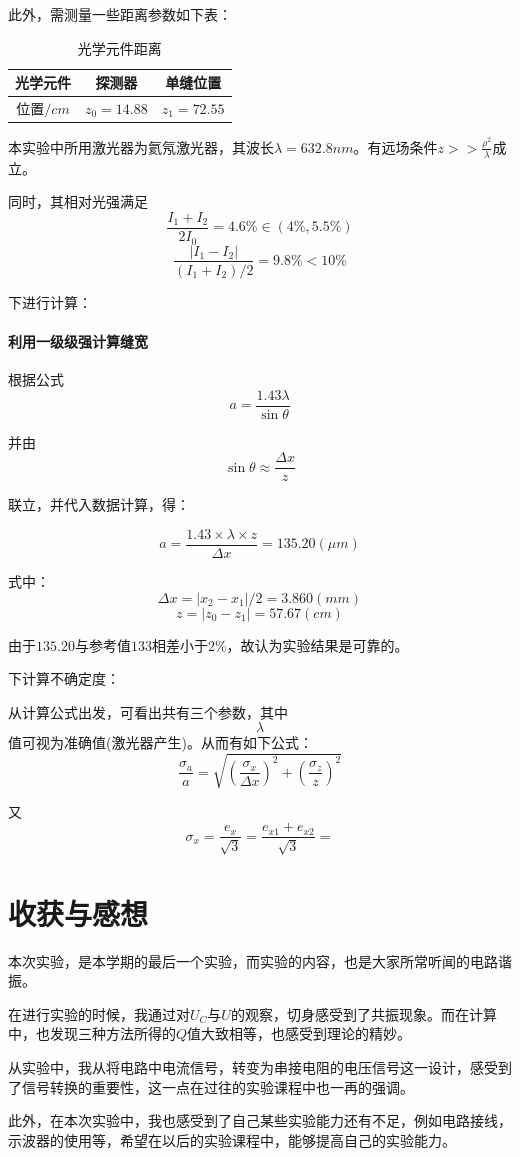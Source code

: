 \documentclass{ctexart}
\begin{document}
  此外，需测量一些距离参数如下表：
\begin{table}[htbp]
  \centering
  \caption{光学元件距离}
    \begin{tabular}{|c|c|c|}\hline
    光学元件  & {探测器} & {单缝位置} \\ \hline
    位置$/cm$ & $z_0=14.88$ & $z_1=72.55$ \\\hline
    \end{tabular}%
  \label{tab:addlabel}%
\end{table}%



本实验中所用激光器为氦氖激光器，其波长$\lambda=632.8nm$。有远场条件$z>>\frac{\rho^2}{\lambda}$成立。

同时，其相对光强满足$$\frac{I_1+I_2}{2I_0}=4.6\%\in(4\%,5.5\%)$$
$$\frac{|I_1-I_2|}{(I_1+I_2)/2}=9.8\%<10\%$$

下进行计算：
\paragraph{利用一级级强计算缝宽}
根据公式
$$a=\frac{1.43\lambda}{\sin{\theta}}$$

并由$$\sin{\theta}\approx \frac{\Delta x}{z}$$

联立，并代入数据计算，得：

$$a=\frac{1.43 \times \lambda \times z}{\Delta x}=135.20(\mu m)$$


式中：$$\Delta x=|x_2-x_1|/2=3.860(mm)$$
$$z=|z_0-z_1|=57.67(cm)$$

由于$135.20\mbox{与参考值}133\mbox{相差小于}2\%$，故认为实验结果是可靠的。

下计算不确定度：

从计算公式出发，可看出共有三个参数，其中$$\lambda$$值可视为准确值(激光器产生)。从而有如下公式：
$$\frac{\sigma_a}a=\sqrt{(\frac{\sigma_x}{\Delta x})^2+(\frac{\sigma_z}z)^2}$$

又$$\sigma_x=\frac{e_x}{\sqrt{3}}=\frac{e_{x1}+e_{x2}}{\sqrt{3}}=$$
      \section{收获与感想}
      本次实验，是本学期的最后一个实验，而实验的内容，也是大家所常听闻的电路谐振。

      在进行实验的时候，我通过对$U_C$与$U$的观察，切身感受到了共振现象。而在计算中，也发现三种方法所得的$Q$值大致相等，也感受到理论的精妙。

      从实验中，我从将电路中电流信号，转变为串接电阻的电压信号这一设计，感受到了信号转换的重要性，这一点在过往的实验课程中也一再的强调。

      此外，在本次实验中，我也感受到了自己某些实验能力还有不足，例如电路接线，示波器的使用等，希望在以后的实验课程中，能够提高自己的实验能力。
\end{document}
